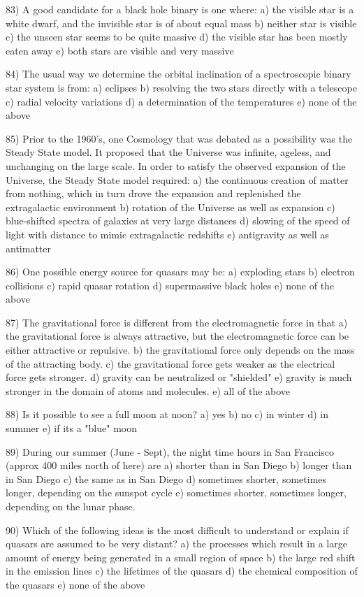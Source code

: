 83) A good candidate for a black hole binary is one where:
a) the visible star is a white dwarf, and the invisible star is
of about equal mass
b) neither star is visible
c) the unseen star seems to be quite massive
d) the visible star has been mostly eaten away
e) both stars are visible and very massive

84) The usual way we determine the orbital inclination of a spectroscopic
binary star system is from:
a) eclipses b) resolving the two stars directly with a telescope
c) radial velocity variations d) a determination of the temperatures
e) none of the above

85) Prior to the 1960's, one Cosmology that was debated as a possibility was
the Steady State model. It proposed that the Universe was infinite,
ageless, and unchanging on the large scale. In order to satisfy the
observed expansion of the Universe, the Steady State model required:
a) the continuous creation of matter from nothing, which in turn drove the
expansion and replenished the extragalactic environment
b) rotation of the Universe as well as expansion
c) blue-shifted spectra of galaxies at very large distances
d) slowing of the speed of light with distance to mimic extragalactic
redshifts
e) antigravity as well as antimatter

86) One possible energy source for quasars may be:
a) exploding stars b) electron collisions
c) rapid quasar rotation d) supermassive black holes
e) none of the above

87) The gravitational force is different from the electromagnetic force in that
a) the gravitational force is always attractive, but the electromagnetic
force can be either attractive or repulsive.
b) the gravitational force only depends on the mass of the attracting body.
c) the gravitational force gets weaker as the electrical force gets stronger.
d) gravity can be neutralized or "shielded"
e) gravity is much stronger in the domain of atoms and molecules.
e) all of the above

88) Is it possible to see a full moon at noon?
a) yes b) no c) in winter d) in summer e) if its a "blue" moon

89) During our summer (June - Sept), the night time hours in San Francisco
(approx 400 miles north of here) are
a) shorter than in San Diego
b) longer than in San Diego
c) the same as in San Diego
d) sometimes shorter, sometimes longer, depending on the sunspot cycle
e) sometimes shorter, sometimes longer, depending on the lunar phase.

90) Which of the following ideas is the most difficult to understand or explain
if quasars are assumed to be very distant?
a) the processes which result in a large amount of energy being generated
in a small region of space
b) the large red shift in the emission lines
c) the lifetimes of the quasars
d) the chemical composition of the quasars
e) none of the above

